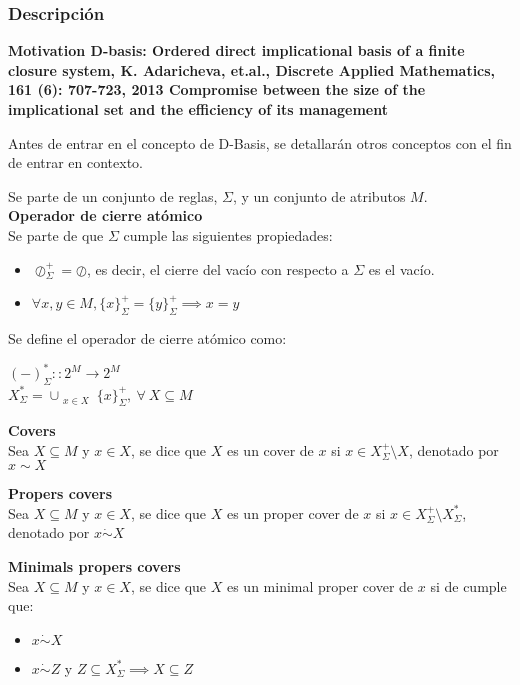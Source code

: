 \subsubsection{Descripci\'on} 

\textbf{Motivation
D-basis: Ordered direct implicational basis of a finite closure system, K. Adaricheva, et.al., Discrete Applied Mathematics, 161 (6): 707-723, 2013
Compromise between the size of the implicational set and the efficiency of its management
}
\cite{DBasis}

Antes de entrar en el concepto de D-Basis, se detallar\'an otros conceptos con el fin de entrar en contexto.

Se parte de un conjunto de reglas, \( \Sigma \), y un conjunto de atributos \( M \).\\

\textbf{Operador de cierre at\'omico}\\
Se parte de que \(\Sigma\) cumple las siguientes propiedades:
\begin{itemize}
    \item \(\oslash^+_{\Sigma} = \oslash\), es decir, el cierre del vac\'io con respecto a \(\Sigma\) es el vac\'io.
    \item \(\forall x,y \in M, \{x\}^+_{\Sigma} = \{y\}^+_{\Sigma} \implies x = y\)
\end{itemize}
Se define el operador de cierre at\'omico como: 
\begin{center}
    \((-)^*_{\Sigma}::2^M \to 2^M \) \\
    \(X^*_{\Sigma} = \cup_{\substack{x \in X}} \{x\}^+_{\Sigma}, \ \forall \ X \subseteq M \)
\end{center}


\textbf{Covers}\\
Sea \(X \subseteq M\) y \(x \in X\), se dice que \(X\) es un cover de \(x\) si \(x \in X^+_{\Sigma} \setminus X\), denotado por \(x \sim X\)

\textbf{Propers covers} \\
Sea \(X \subseteq M\) y \(x \in X\), se dice que \(X\) es un proper cover de \(x\) si \(x \in X^+_{\Sigma} \setminus X^*_{\Sigma}\), denotado por \(x \dot\sim X\)

\textbf{Minimals propers covers}\\
Sea \(X \subseteq M\) y \(x \in X\), se dice que \(X\) es un minimal proper cover de \(x\) si de cumple que:
\begin{itemize}
    \item \(x \dot\sim X\)
    \item \(x \dot\sim Z\) y \(Z \subseteq X^*_{\Sigma} \implies X \subseteq Z\)
\end{itemize}

